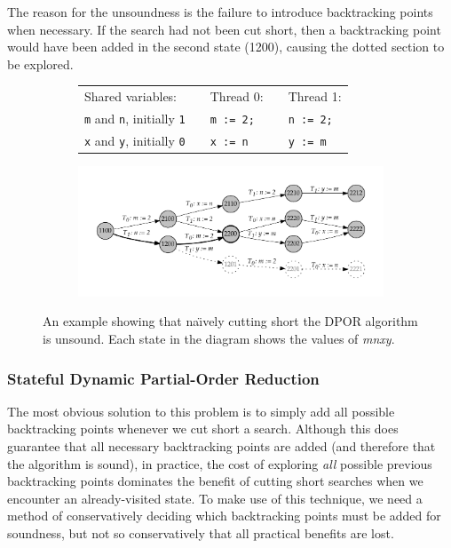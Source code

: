 \documentclass[12pt,a4paper,twoside,openright]{report}
\begin{document}
The reason for the unsoundness is the failure to
introduce backtracking points when necessary. If the
search had not been cut short, then a backtracking point
would have been added in the second state (1200), causing the
dotted section to be explored.

\begin{figure}
	\begin{subfigure}{\textwidth}
		\begin{tabular}{lp{1cm}lp{0cm}l}
		Shared variables: &&Thread 0: &&Thread 1: \\
		\qquad \texttt{m} and \texttt{n}, initially \texttt{1}
			&&\qquad\texttt{m := 2;}
			&& \qquad\texttt{n := 2;} \\
		\qquad \texttt{x} and \texttt{y}, initially \texttt{0}
			&&\qquad\texttt{x := n}
			&& \qquad\texttt{y := m}
		\end{tabular}
	\end{subfigure}
	\begin{subfigure}{\textwidth}
		\includegraphics[width=\textwidth]{sdpor}
	\end{subfigure}
	\caption[An example illustrating the need for the
		Stateful DPOR algorithm.]
		{An example showing that na\"{\i}vely
		cutting short the DPOR algorithm is
		unsound. Each state in the diagram shows
	the values of \textit{mnxy}.}
	\label{fig:sdpor-motivation}
\end{figure}

\subsubsection{Stateful Dynamic Partial-Order Reduction}
The most obvious solution to this problem is to simply
add all possible backtracking points whenever we cut
short a search. Although this does guarantee that all
necessary backtracking points are added (and therefore
that the algorithm is sound), in practice, the cost
of exploring \emph{all} possible previous backtracking points
dominates the benefit of cutting short searches when we
encounter an already-visited state. To make use of this
technique, we need a method of conservatively deciding which
backtracking points must be added for soundness, but not
so conservatively that all practical benefits are lost.
\end{document}
